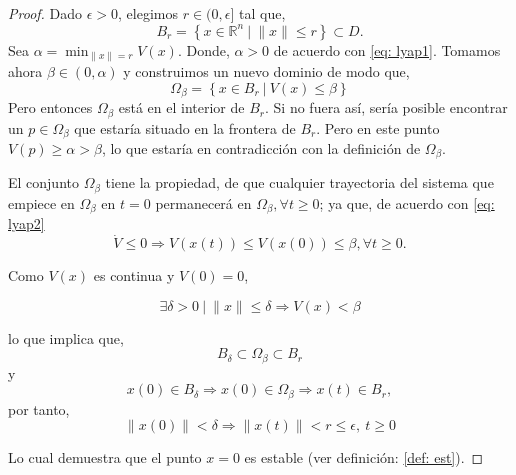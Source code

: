 \begin{proof}
Dado $\epsilon > 0$, elegimos $r \in (0,\epsilon]$ tal que,
\begin{equation*}
B_r = \left\{ x \in \mathbb{R}^n \ |\  \|x\| \leq r \right\} \subset D.
\end{equation*}
Sea $\alpha =  \min_{\|x\| = r}V(x)$. Donde, $\alpha >0$ de acuerdo con \ref{eq: lyap1}. Tomamos ahora $\beta \in (0,\alpha)$ y construimos un nuevo dominio de modo que,
\begin{equation*}
\Omega_\beta = \left\{ x \in B_r \ |\  V(x) \leq \beta \right\}
\end{equation*}
Pero entonces $\Omega_\beta$ está en el interior de $B_r$.  Si no fuera así, sería posible encontrar un $p \in \Omega_\beta$ que estaría situado en la frontera de $B_r$. Pero en este punto $V(p) \ge \alpha > \beta$, lo que estaría en contradicción con la definición de $\Omega_\beta$. 

El conjunto $\Omega_\beta$ tiene la propiedad, de que cualquier trayectoria del sistema que empiece en $\Omega_\beta$  en $t=0$ permanecerá en $\Omega_\beta, \forall t \geq 0$; ya que, de acuerdo con \ref{eq: lyap2}
\begin{equation*}
\dot V \leq 0 \Rightarrow V(x(t)) \leq V(x(0)) \leq \beta, \forall t \geq 0.
\end{equation*}

Como $V(x)$ es continua y $V(0) = 0$,

\begin{equation*}
\exists \delta > 0\  |\  \|x\| \leq \delta \Rightarrow V(x) < \beta
\end {equation*}

lo que implica que,
\begin{equation*}
B_\delta \subset \Omega_\beta \subset B_r
\end{equation*}
y
\begin{equation*}
x(0) \in B_\delta \Rightarrow x(0) \in \Omega_\beta \Rightarrow x(t) \in B_r,
\end{equation*}
por tanto,
\begin{equation*}
\|x(0)\| < \delta \Rightarrow \|x(t)\|<r \leq \epsilon, \ t \geq 0
\end{equation*}

Lo cual demuestra que el punto $x=0$ es estable (ver definición: \ref{def: est}). 


\end{proof}
